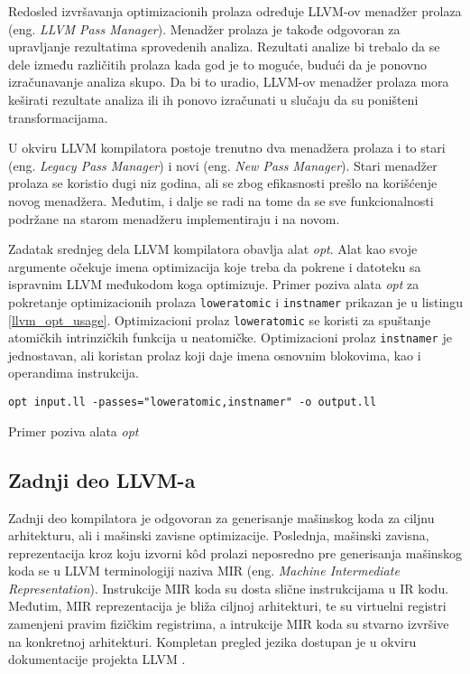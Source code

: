 \documentclass[12pt,oneside]{memoir}
\begin{document}
Redosled izvršavanja optimizacionih prolaza određuje LLVM-ov menadžer prolaza (eng. \textit{LLVM Pass Manager}). Menadžer prolaza je takođe odgovoran za upravljanje rezultatima sprovedenih analiza. Rezultati analize bi trebalo da se dele između različitih prolaza kada god je to moguće, budući da je ponovno izračunavanje analiza skupo. Da bi to uradio, LLVM-ov menadžer prolaza mora keširati rezultate analiza ili ih ponovo izračunati u slučaju da su poništeni transformacijama. 

U okviru LLVM kompilatora postoje trenutno dva menadžera prolaza i to stari (eng. \textit{Legacy Pass Manager}) i novi (eng. \textit{New Pass Manager}). Stari menadžer prolaza se koristio dugi niz godina, ali se zbog efikasnosti prešlo na korišćenje novog menadžera. Međutim, i dalje se radi na tome da se sve funkcionalnosti podržane na starom menadžeru implementiraju i na novom. 

Zadatak srednjeg dela LLVM kompilatora obavlja alat \textit{opt}. Alat kao svoje argumente očekuje imena optimizacija koje treba da pokrene i datoteku sa ispravnim LLVM međukodom koga optimizuje. Primer poziva alata \textit{opt} za pokretanje optimizacionih prolaza \texttt{loweratomic} i \texttt{instnamer} prikazan je u listingu \ref{llvm_opt_usage}. Optimizacioni prolaz \texttt{loweratomic} se koristi za spuštanje atomičkih intrinzičkih funkcija u neatomičke. Optimizacioni prolaz \texttt{instnamer} je jednostavan, ali koristan prolaz koji daje imena osnovnim blokovima, kao i operandima instrukcija. 

\begin{listing}[ht!]
\begin{verbatim}
opt input.ll -passes="loweratomic,instnamer" -o output.ll
\end{verbatim}
\caption{Primer poziva alata \textit{opt}}
\label{llvm_opt_usage}
\end{listing}

\subsection{Zadnji deo LLVM-a}
Zadnji deo kompilatora je odgovoran za generisanje mašinskog koda za ciljnu arhitekturu, ali i mašinski zavisne optimizacije. Poslednja, mašinski zavisna, reprezentacija kroz koju izvorni k\^od prolazi neposredno pre generisanja mašinskog koda se u LLVM terminologiji naziva MIR (eng. \textit{Machine Intermediate Representation}). Instrukcije MIR koda su dosta slične instrukcijama u IR kodu. Međutim, MIR reprezentacija je bliža ciljnoj arhitekturi, te su virtuelni registri zamenjeni pravim fizičkim registrima, a intrukcije MIR koda su stvarno izvršive na konkretnoj arhitekturi. Kompletan pregled jezika dostupan je u okviru dokumentacije projekta LLVM \cite{mir_documentation}.
\end{document}

